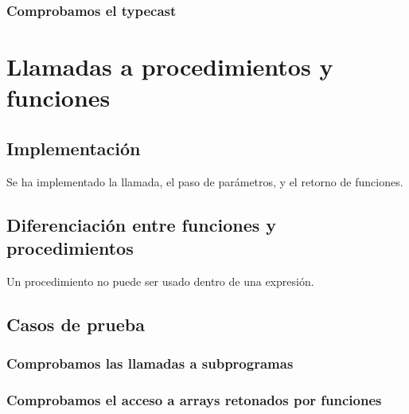		\subsubsection*{Comprobamos el typecast}
		
		
		


\clearpage

\section{Llamadas a procedimientos y funciones}

	\subsection{Implementación}
	
		Se ha implementado la llamada, el paso de parámetros, y el retorno de funciones.

	\subsection{Diferenciación entre funciones y procedimientos}
	
		Un procedimiento no puede ser usado dentro de una expresión.
	
	\subsection{Casos de prueba}
		
		\subsubsection*{Comprobamos las llamadas a subprogramas}
		
		
		
		
		\clearpage
		
		\subsubsection*{Comprobamos el acceso a arrays retonados por funciones}
		
		
		
		

